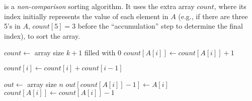 \documentclass{report}
\begin{document}
 is a \textit{non-comparison} sorting algorithm. It uses the extra array $count$, where its index initially represents the value of each element in $A$ (e.g., if there are three 5's in $A$, $count[5] = 3$ before the ``accumulation'' step to determine the final index), to sort the array.

\noindent \hrulefill

\begin{algorithmic}[1]
   
    \State $count \gets$ array size $k + 1$ filled with 0
     
      \State $count[A[i]] \gets count[A[i]] + 1$
    \EndFor
    \item[]
     
      \State $count[i] \gets count[i] + count[i - 1]$
    \EndFor
    \item[]
    \State $out \gets$ array size $n$
     
      \State $out[count[A[i]] - 1] \gets A[i]$
      \State $count[A[i]] \gets count[A[i]] - 1$
    \EndFor
    \item[]
    \State {}
  \EndFunction
\end{algorithmic}
\noindent \hrulefill
\end{document}
